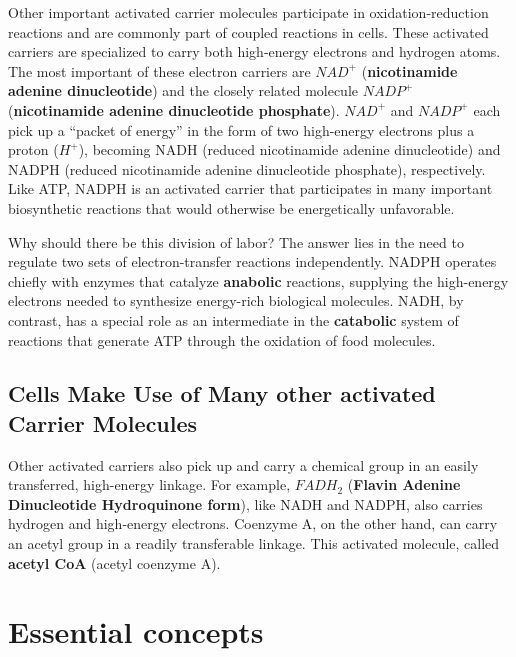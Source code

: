Other important activated carrier molecules participate in oxidation-reduction
reactions and are commonly part of coupled reactions in cells.
These activated carriers are specialized to carry both high-energy electrons
and hydrogen atoms. The most important of these electron carriers
are $NAD^{+}$ (\textbf{nicotinamide adenine dinucleotide}) and the closely related
molecule $NADP^{+}$ (\textbf{nicotinamide adenine dinucleotide phosphate}).
$NAD^{+}$ and $NADP^{+}$ each pick up a “packet of energy” in the form of two high-energy
electrons plus a proton ($H^{+}$), becoming NADH (reduced nicotinamide
adenine dinucleotide) and NADPH (reduced nicotinamide adenine dinucleotide
phosphate), respectively.
Like ATP, NADPH is an activated carrier that participates in many
important biosynthetic reactions that would otherwise be energetically
unfavorable.

Why should there be this division of labor? The answer lies in the need
to regulate two sets of electron-transfer reactions independently. NADPH
operates chiefly with enzymes that catalyze \textbf{anabolic} reactions, supplying
the high-energy electrons needed to synthesize energy-rich biological
molecules. NADH, by contrast, has a special role as an intermediate in
the \textbf{catabolic} system of reactions that generate ATP through the oxidation
of food molecules.

\subsection{Cells Make Use of Many other activated Carrier Molecules}

Other activated carriers also pick up and carry a chemical group in an
easily transferred, high-energy linkage. For example, $FADH_{2}$ (\textbf{Flavin Adenine Dinucleotide Hydroquinone form}),
like NADH and NADPH, also carries hydrogen and high-energy electrons.
Coenzyme A, on the other hand, can carry an acetyl
group in a readily transferable linkage. This activated molecule, called
\textbf{acetyl CoA} (acetyl coenzyme A).

\section{Essential concepts}

